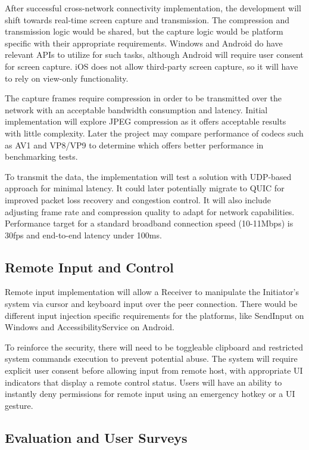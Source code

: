 \documentclass[12pt,a4paper]{article}
\begin{document}
After successful cross-network connectivity implementation, the development will shift towards real-time screen capture and transmission. The compression and transmission logic would be shared, but the capture logic would be platform specific with their appropriate requirements. Windows and Android do have relevant APIs to utilize for such tasks, although Android will require user consent for screen capture. iOS does not allow third-party screen capture, so it will have to rely on view-only functionality.

The capture frames require compression in order to be transmitted over the network with an acceptable bandwidth consumption and latency. Initial implementation will explore JPEG compression as it offers acceptable results with little complexity. Later the project may compare performance of codecs such as AV1 \cite{RA25} and VP8/VP9 \cite{Rue24} to determine which offers better performance in benchmarking tests.

To transmit the data, the implementation will test a solution with UDP-based approach for minimal latency. It could later potentially migrate to QUIC for improved packet loss recovery and congestion control. It will also include adjusting frame rate and compression quality to adapt for network capabilities. Performance target for a standard broadband connection speed (10-11Mbps) is 30fps and end-to-end latency under 100ms.

\subsection{Remote Input and Control}

Remote input implementation will allow a Receiver to manipulate the Initiator's system via cursor and keyboard input over the peer connection. There would be different input injection specific requirements for the platforms, like SendInput on Windows and AccessibilityService on Android.

To reinforce the security, there will need to be toggleable clipboard and restricted system commands execution to prevent potential abuse. The system will require explicit user consent before allowing input from remote host, with appropriate UI indicators that display a remote control status. Users will have an ability to instantly deny permissions for remote input using an emergency hotkey or a UI gesture.

\subsection{Evaluation and User Surveys}
\end{document}
